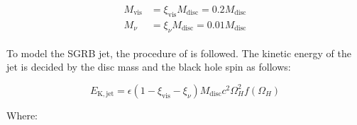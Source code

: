     \begin{align}
        \begin{split}
            M_{\mathrm{vis}} &=
                \xi_{\mathrm{vis}}M_{\mathrm{disc}} =
                    0.2M_{\mathrm{disc}} \\
            M_{\nu} &=
                \xi_{\nu}M_{\mathrm{disc}} =
                    0.01 M_{\mathrm{disc}}
        \end{split}
    \end{align}

    To model the SGRB jet, the procedure of \cite{zhu_2020} is followed. The
    kinetic energy of the jet is decided by the disc mass and the black hole spin as
    follows:

    \begin{equation}
        E_{\mathrm{K, jet}} =
            \epsilon(1 - \xi_{\mathrm{vis}} - \xi_{\nu})
            M_{\mathrm{disc}} c^2 \Omega_H^2 f(\Omega_H)
        \label{eq:e_kin_jet}
    \end{equation}

    Where:

